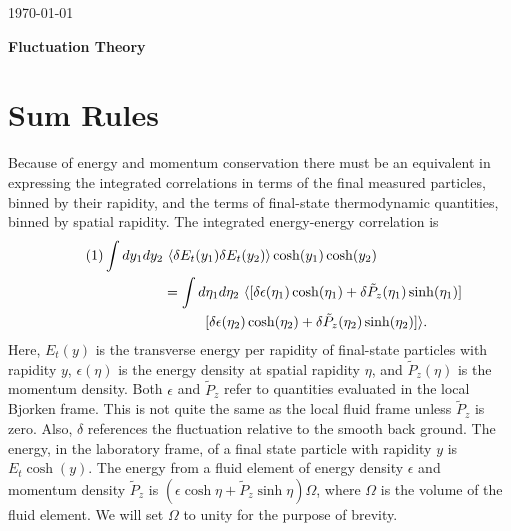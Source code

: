 \documentclass[12pt]{article}
\numberwithin{equation}{section}
\numberwithin{figure}{section}
\newcommand\eqnumber{\addtocounter{equation}{1}\tag{\theequation}}
\begin{document}
\today\\

\centerline{\bf \large Fluctuation Theory}

\section{Sum Rules}

Because of energy and momentum conservation there must be an equivalent in expressing the integrated correlations in terms of the final measured particles, binned by their rapidity, and the terms of final-state thermodynamic quantities, binned by spatial rapidity. The integrated energy-energy correlation is
\begin{align*}\eqnumber\label{eq:Eequil}
\int dy_1dy_2&~\langle\delta E_t(y_1)\delta E_t(y_2)\rangle\cosh(y_1)\cosh(y_2)\\
&=\int d\eta_1d\eta_2~\langle[\delta\epsilon(\eta_1)\cosh(\eta_1)+\delta\tilde{P}_z(\eta_1)\sinh(\eta_1)]\\
&\hspace*{30pt}[\delta\epsilon(\eta_2)\cosh(\eta_2)+\delta\tilde{P}_z(\eta_2)\sinh(\eta_2)]\rangle.
\end{align*}
Here, $E_t(y)$ is the transverse energy per rapidity of final-state particles with rapidity $y$, $\epsilon(\eta)$ is the energy density at spatial rapidity $\eta$, and $\tilde{P}_z(\eta)$ is the momentum density. Both $\epsilon$ and $\tilde{P}_z$ refer to quantities evaluated in the local Bjorken frame. This is not quite the same as the local fluid frame unless $\tilde{P}_z$ is zero. Also, $\delta$ references the fluctuation relative to the smooth back ground. The energy, in the laboratory frame, of a final state particle with rapidity $y$ is $E_t\cosh(y)$. The energy from a fluid element of energy density $\epsilon$ and momentum density $\tilde{P}_z$ is $(\epsilon\cosh\eta+\tilde{P}_z\sinh\eta)\Omega$, where $\Omega$ is the volume of the fluid element. We will set $\Omega$ to unity for the purpose of brevity.
\end{document}

